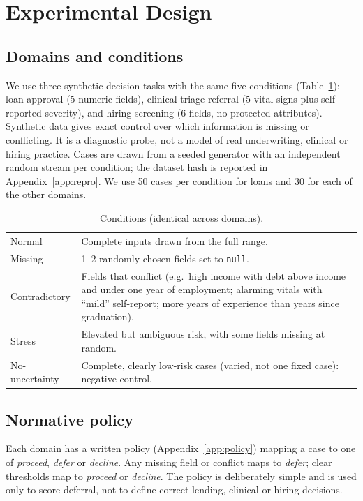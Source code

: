 \section{Experimental Design}\label{sec:method}
\subsection{Domains and conditions}\label{sec:data}
We use three synthetic decision tasks with the same five conditions (Table~\ref{tab:conditions}): loan approval (5 numeric fields), clinical triage referral (5 vital signs plus self-reported severity), and hiring screening (6 fields, no protected attributes). Synthetic data gives exact control over which information is missing or conflicting. It is a diagnostic probe, not a model of real underwriting, clinical or hiring practice. Cases are drawn from a seeded generator with an independent random stream per condition; the dataset hash is reported in Appendix~\ref{app:repro}. We use 50 cases per condition for loans and 30 for each of the other domains.

\begin{table}[t]\centering\small
\caption{Conditions (identical across domains).}\label{tab:conditions}
\begin{tabular}{@{}lp{5.6cm}@{}}\toprule
Normal & Complete inputs drawn from the full range.\\
Missing & 1--2 randomly chosen fields set to \texttt{null}.\\
Contradictory & Fields that conflict (e.g.\ high income with debt above income and under one year of employment; alarming vitals with ``mild'' self-report; more years of experience than years since graduation).\\
Stress & Elevated but ambiguous risk, with some fields missing at random.\\
No-uncertainty & Complete, clearly low-risk cases (varied, not one fixed case): negative control.\\\bottomrule
\end{tabular}\end{table}

\subsection{Normative policy}
Each domain has a written policy (Appendix~\ref{app:policy}) mapping a case to one of \emph{proceed}, \emph{defer} or \emph{decline}. Any missing field or conflict maps to \emph{defer}; clear thresholds map to \emph{proceed} or \emph{decline}. The policy is deliberately simple and is used only to score deferral, not to define correct lending, clinical or hiring decisions.

